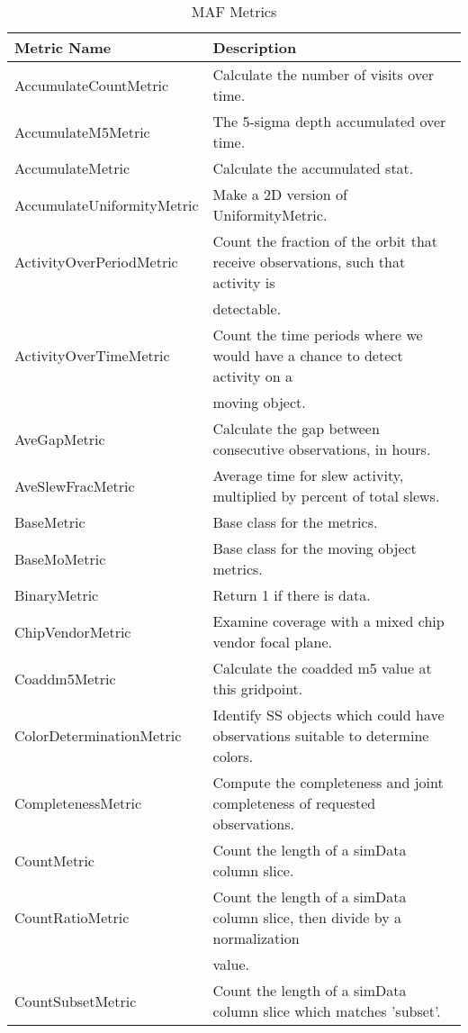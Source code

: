 \begin{table}
\scriptsize
\caption{MAF Metrics}
\begin{tabular}{ll}
\hline
                Metric Name &                                                                       Description \\
\hline
 AccumulateCountMetric &  Calculate the number of visits over time. \\
 AccumulateM5Metric &  The 5-sigma depth accumulated over time. \\
 AccumulateMetric &  Calculate the accumulated stat. \\
 AccumulateUniformityMetric &  Make a 2D version of UniformityMetric. \\
 ActivityOverPeriodMetric &  Count the fraction of the orbit that receive observations, such that activity is \\
  &  detectable. \\
 ActivityOverTimeMetric &  Count the time periods where we would have a chance to detect activity on a \\
  &  moving object. \\
 AveGapMetric &  Calculate the gap between consecutive observations, in hours. \\
 AveSlewFracMetric &  Average time for slew activity, multiplied by percent of total slews. \\
 BaseMetric &  Base class for the metrics. \\
 BaseMoMetric &  Base class for the moving object metrics. \\
 BinaryMetric &  Return 1 if there is data. \\
 ChipVendorMetric &  Examine coverage with a mixed chip vendor focal plane. \\
 Coaddm5Metric &  Calculate the coadded m5 value at this gridpoint. \\
 ColorDeterminationMetric &  Identify SS objects which could have observations suitable to determine colors. \\
 CompletenessMetric &  Compute the completeness and joint completeness of requested observations. \\
 CountMetric &  Count the length of a simData column slice. \\
 CountRatioMetric &  Count the length of a simData column slice, then divide by a normalization \\
  &  value. \\
 CountSubsetMetric &  Count the length of a simData column slice which matches 'subset'. \\

\end{tabular}
\end{table}
